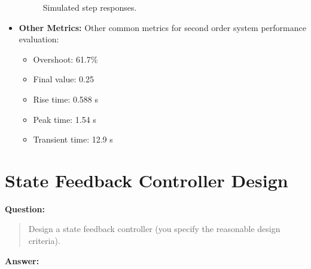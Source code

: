 \documentclass[12pt, oneside]{article}
\begin{document}
\begin{itemize}
        \begin{figure}[htbp]
          \centering
          \quad %
          \caption{Simulated step responses.}
        \end{figure}

    \item \textbf{Other Metrics:}  Other common metrics for second order system performance evaluation:
        \begin{itemize}
            \item Overshoot: 61.7\%
            \item Final value: 0.25
            \item Rise time: 0.588 s
            \item Peak time: 1.54 s
            \item Transient time: 12.9 s
        \end{itemize}
\end{itemize}



\section{State Feedback Controller Design}
\textbf{Question:}
\begin{quote}
Design a state feedback controller (you specify the reasonable design criteria).
\end{quote}
\textbf{Answer:}
\end{document}
